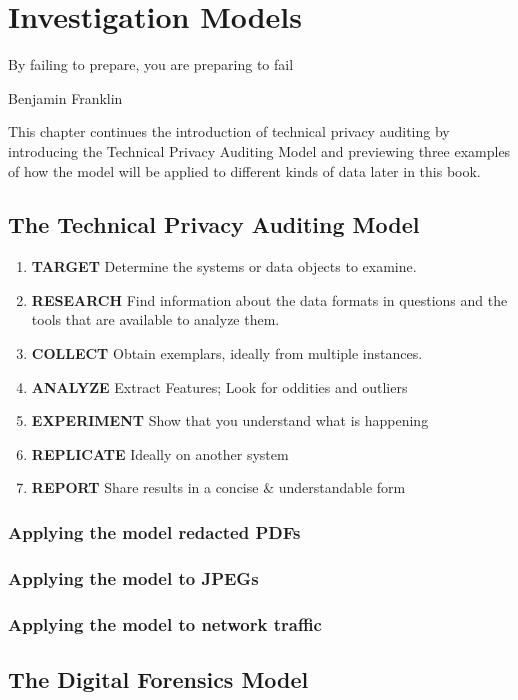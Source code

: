 \chapter{Investigation Models}
\setlength{\epigraphwidth}{3in}
\epigraph{By failing to prepare, you are preparing to fail}{Benjamin Franklin}

This chapter continues the introduction of technical privacy
auditing by introducing the Technical Privacy Auditing Model and
previewing three examples of how the model will be applied to
different kinds of data later in this book.

\section{The Technical Privacy Auditing Model}

\begin{enumerate}
\item \textbf{TARGET} Determine the systems or data objects to examine.
\item \textbf{RESEARCH} Find information about the data formats in
  questions and the tools that are available to analyze them. 
\item \textbf{COLLECT} Obtain exemplars, ideally from multiple instances.
\item \textbf{ANALYZE} Extract Features; Look for oddities and outliers
\item \textbf{EXPERIMENT} Show that you understand what is happening
\item \textbf{REPLICATE} Ideally on another system
\item \textbf{REPORT} Share results in a concise \& understandable form
\end{enumerate}


\subsection{Applying the model redacted PDFs}

\subsection{Applying the model to JPEGs}

\subsection{Applying the model to network traffic}

\section{The Digital Forensics Model}

